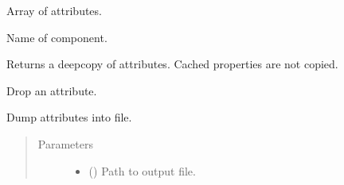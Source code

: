 \documentclass[letterpaper,10pt,english]{sphinxmanual}
\begin{document}
\begin{fulllineitems}
\begin{fulllineitems}
\begin{quote}
\begin{description}
\end{description}\end{quote}

\end{fulllineitems}


\begin{fulllineitems}
\label{\detokenize{api/tables:geology.src.Tables.attributes}}
Array of attributes.

\end{fulllineitems}


\begin{fulllineitems}
\label{\detokenize{api/tables:geology.src.Tables.class_name}}
Name of component.

\end{fulllineitems}


\begin{fulllineitems}
\label{\detokenize{api/tables:geology.src.Tables.copy}}
Returns a deepcopy of attributes. Cached properties are not copied.

\end{fulllineitems}


\begin{fulllineitems}
\label{\detokenize{api/tables:geology.src.Tables.drop}}
Drop an attribute.

\end{fulllineitems}


\begin{fulllineitems}
\label{\detokenize{api/tables:geology.src.Tables.dump}}
Dump attributes into file.
\begin{quote}\begin{description}
\item[{Parameters}] \leavevmode\begin{itemize}
\item {} 
 () \textendash{} Path to output file.


\end{itemize}
\end{description}
\end{quote}
\end{fulllineitems}
\end{fulllineitems}
\end{document}
